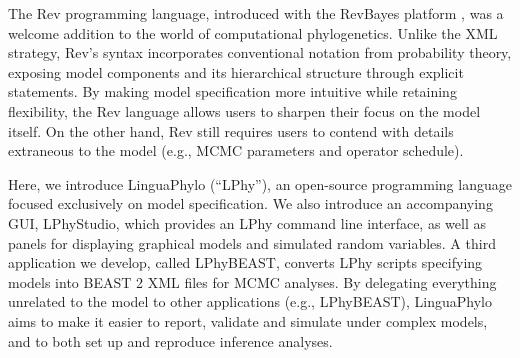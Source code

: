 \documentclass[10pt,letterpaper,table]{article}
\begin{document}
The Rev programming language, introduced with the RevBayes platform
\cite{revbayes}, was a welcome addition to the world of computational
phylogenetics. 
Unlike the XML strategy, Rev's syntax incorporates conventional
notation from probability theory, exposing model
components and its hierarchical structure through explicit statements.
By making model specification more intuitive while retaining
flexibility, the Rev language allows users to sharpen their focus on
the model itself.
On the other hand, Rev still requires users to contend with
details extraneous to the model (e.g., MCMC parameters and operator
schedule).

Here, we introduce LinguaPhylo (``LPhy''), an open-source programming
language focused exclusively on model specification.
We also introduce an accompanying GUI, LPhyStudio, which provides an
LPhy command line interface, as well as panels for displaying graphical models
and simulated random variables.
A third application we develop, called LPhyBEAST, converts LPhy scripts 
specifying models into BEAST 2 XML files for MCMC analyses.
By delegating everything unrelated to the model to other applications
(e.g., LPhyBEAST), LinguaPhylo aims to make it easier to report,
validate and simulate under complex models, and to both set up and
reproduce inference analyses.


\end{document}
